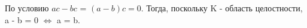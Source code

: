 По условию $ac - bc$ = $(a - b)c = 0$. Тогда, поскольку K - область целостности, a - b = 0 $\Longleftrightarrow$ a = b.